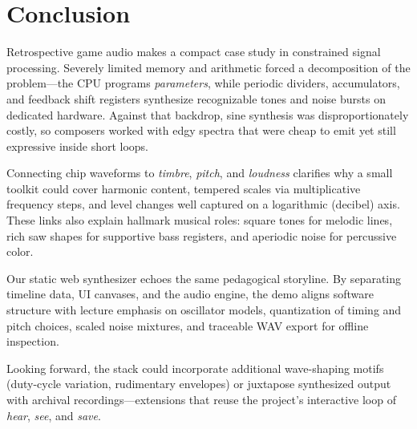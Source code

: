 \section{Conclusion}
\label{sec:conclusion}

Retrospective game audio makes a compact case study in constrained signal processing.
Severely limited memory and arithmetic forced a decomposition of the problem---the CPU programs \emph{parameters}, while periodic dividers, accumulators, and feedback shift registers synthesize recognizable tones and noise bursts on dedicated hardware.
Against that backdrop, sine synthesis was disproportionately costly, so composers worked with edgy spectra that were cheap to emit yet still expressive inside short loops.

Connecting chip waveforms to \emph{timbre}, \emph{pitch}, and \emph{loudness} clarifies why a small toolkit could cover harmonic content, tempered scales via multiplicative frequency steps, and level changes well captured on a logarithmic (decibel) axis.
These links also explain hallmark musical roles: square tones for melodic lines, rich saw shapes for supportive bass registers, and aperiodic noise for percussive color.

Our static web synthesizer echoes the same pedagogical storyline.
By separating timeline data, UI canvases, and the audio engine, the demo aligns software structure with lecture emphasis on oscillator models, quantization of timing and pitch choices, scaled noise mixtures, and traceable WAV export for offline inspection.

Looking forward, the stack could incorporate additional wave-shaping motifs (duty-cycle variation, rudimentary envelopes) or juxtapose synthesized output with archival recordings---extensions that reuse the project's interactive loop of \emph{hear}, \emph{see}, and \emph{save}.
